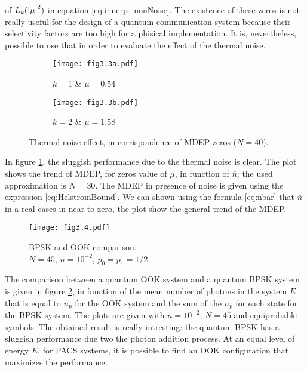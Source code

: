     of $L_k(\absolutevalue{\mu}^2)$ in equation \ref{eq:innerp_nonNoise}.
    The existence of these zeros is not really useful for the design of a quantum communication
    system because their selectivity factors are too high for a phisical implementation. It is, 
    nevertheless, possible to use that in order to evaluate the effect of the thermal noise.
    \begin{figure}[tbp]
        \begin{subfigure}{0.5\textwidth}
            \texttt{[image: fig3.3a.pdf]}
            \caption{$k=1$ \& $\mu = 0.54$}
        \end{subfigure}
        \begin{subfigure}{0.5\textwidth}
            \texttt{[image: fig3.3b.pdf]}
            \caption{$k=2$ \& $\mu = 1.58$}
        \end{subfigure}
        \caption{Thermal noise effect, in corrispondence of MDEP zeros ($N=40$).}
        \label{fig:3.3}
    \end{figure}
    In figure \ref{fig:3.3}, the sluggish performance due to the thermal noise is clear. The plot
    shows the trend of MDEP, for zeros value of $\mu$, in function of $\bar{n}$; the used approximation
    is $N=30$. The MDEP in presence of noise is given using the expression \ref{eq:HelstromBound}.
    We can shown using the formula \ref{eq:nbar} that $\bar{n}$ in a real cases in near to zero, the 
    plot show the general trend of the MDEP.

    \begin{figure}[tbp]
        \texttt{[image: fig3.4.pdf]}
        \caption{BPSK and OOK comparison. \\$N=45$, $\bar{n}=10^{-2}$, $p_0=p_1=1/2$}
        \label{fig:3.4}
    \end{figure}
    The comparison between a quantum OOK system and a quantum BPSK system is given in figure 
    \ref{fig:3.4}, in function of the mean number of photons in the system $\bar{E}$, that is equal to
    $n_p$ for the OOK system and the sum of the $n_p$ for each state for the BPSK system.
    The plots are given with $\bar{n}= 10^{-2}$, $N=45$ and equiprobable symbols.
    The obtained result is really intresting: the quantum BPSK has a sluggish performance due two 
    the photon addition process. At an equal level of energy $\bar{E}$, for PACS systems, it is
    possible to find an OOK configuration that maximizes the performance.
    